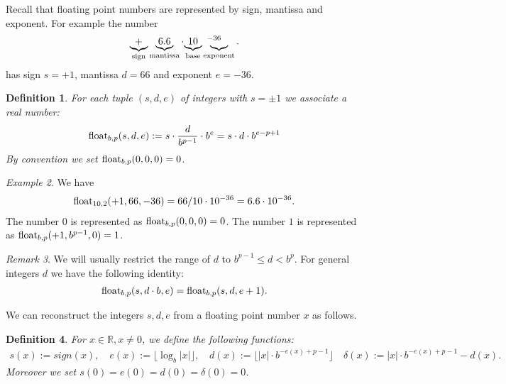 \documentclass{article}
\theoremstyle{plain}
\newtheorem{definition}{Definition}[section]
\theoremstyle{remark}
\newtheorem{remark}[definition]{Remark}
\newtheorem{example}[definition]{Example}
\newcommand{\IR}{\mathbb{R}}
\newcommand{\floor}[1]{\lfloor#1\rfloor}
\newcommand{\abs}[1]{|#1|}
\begin{document}
Recall that floating point numbers are represented by sign, mantissa and exponent.
For example the number
\begin{align*}
  \underbrace{+}_{\text{sign}} \underbrace{6.6}_{\text{mantissa}} \cdot {\underbrace{10}_{\text{base}}\hspace{.5em}}^{-36} \hspace{-2em}\underbrace{\hspace{.5em}}_{\text{exponent}}.
\end{align*}
has sign $s=+1$, mantissa $d=66$ and exponent $e=-36$.

\begin{definition}
  For each tuple $(s,d,e)$ of integers with $s=\pm1$ we associate a real number:
  \begin{align*}
    \mathrm{float}_{b,p}(s,d,e) := s \cdot \frac{d}{b^{p-1}} \cdot b^e = s \cdot d \cdot b^{e-p+1}
  \end{align*}
  By convention we set $\mathrm{float}_{b,p}(0,0,0)=0$.
\end{definition}

\begin{example}
  We have
  \begin{align*}
    \mathrm{float}_{10,2}(+1,66,-36) = 66/10 \cdot 10^{-36}  = 6.6 \cdot 10^{-36}.
  \end{align*}
  The number $0$ is represented as $\mathrm{float}_{b,p}(0,0,0) = 0$.
  The number $1$ is represented as $\mathrm{float}_{b,p}(+1,b^{p-1},0) = 1$.
\end{example}



\begin{remark}
  We will usually restrict the range of $d$ to $b^{p-1} \leq d < b^p$.
  For general integers $d$ we have the following identity:
  \begin{align*}
    \mathrm{float}_{b,p}(s,d \cdot b,e) = \mathrm{float}_{b,p}(s, d, e + 1).
  \end{align*}
\end{remark}

We can reconstruct the integers $s,d,e$ from a floating point number $x$ as follows.
\begin{definition}
  For $x\in\IR, x\neq 0$, we define the following functions:
  \begin{align*}
    s(x) := sign(x), \quad
    e(x) := \floor{\log_b\abs{x}}, \quad
    d(x) := \floor{\abs{x} \cdot b^{-e(x)+p-1}} \quad
    \delta(x) := \abs{x} \cdot b^{-e(x)+p-1} - d(x).
  \end{align*}
  Moreover we set $s(0) = e(0) = d(0) = \delta(0) = 0$.
\end{definition}
\end{document}

